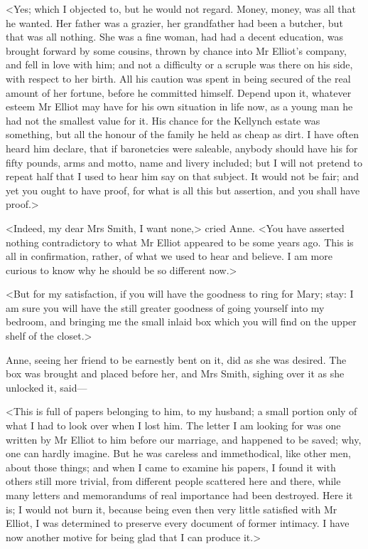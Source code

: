 <Yes; which I objected to, but he would not regard. Money, money, was all that he wanted. Her father was a grazier, her grandfather had been a butcher, but that was all nothing. She was a fine woman, had had a decent education, was brought forward by some cousins, thrown by chance into Mr Elliot's company, and fell in love with him; and not a difficulty or a scruple was there on his side, with respect to her birth. All his caution was spent in being secured of the real amount of her fortune, before he committed himself. Depend upon it, whatever esteem Mr Elliot may have for his own situation in life now, as a young man he had not the smallest value for it. His chance for the Kellynch estate was something, but all the honour of the family he held as cheap as dirt. I have often heard him declare, that if baronetcies were saleable, anybody should have his for fifty pounds, arms and motto, name and livery included; but I will not pretend to repeat half that I used to hear him say on that subject. It would not be fair; and yet you ought to have proof, for what is all this but assertion, and you shall have proof.>

<Indeed, my dear Mrs Smith, I want none,> cried Anne. <You have asserted nothing contradictory to what Mr Elliot appeared to be some years ago. This is all in confirmation, rather, of what we used to hear and believe. I am more curious to know why he should be so different now.>

<But for my satisfaction, if you will have the goodness to ring for Mary; stay: I am sure you will have the still greater goodness of going yourself into my bedroom, and bringing me the small inlaid box which you will find on the upper shelf of the closet.>

Anne, seeing her friend to be earnestly bent on it, did as she was desired. The box was brought and placed before her, and Mrs Smith, sighing over it as she unlocked it, said—

<This is full of papers belonging to him, to my husband; a small portion only of what I had to look over when I lost him. The letter I am looking for was one written by Mr Elliot to him before our marriage, and happened to be saved; why, one can hardly imagine. But he was careless and immethodical, like other men, about those things; and when I came to examine his papers, I found it with others still more trivial, from different people scattered here and there, while many letters and memorandums of real importance had been destroyed. Here it is; I would not burn it, because being even then very little satisfied with Mr Elliot, I was determined to preserve every document of former intimacy. I have now another motive for being glad that I can produce it.>

